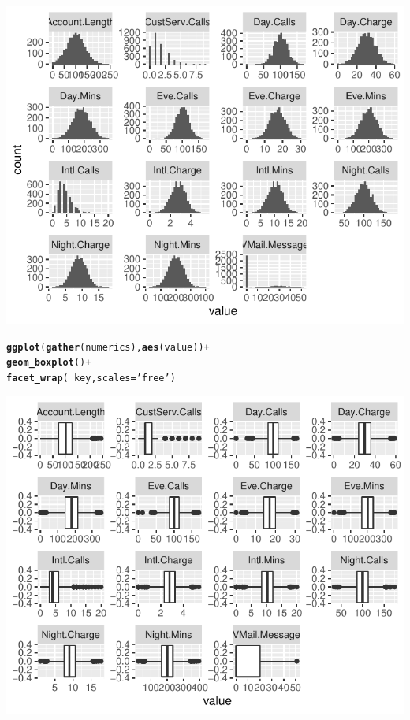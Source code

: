 \documentclass{article}\usepackage[]{graphicx}\usepackage[]{color}
\makeatletter
\def\maxwidth{ %
  \ifdim\Gin@nat@width>\linewidth
    \linewidth
  \else
    \Gin@nat@width
  \fi
}
\newcommand{\hlstr}[1]{\textcolor[rgb]{0.192,0.494,0.8}{#1}}%
\newcommand{\hlopt}[1]{\textcolor[rgb]{0,0,0}{#1}}%
\newcommand{\hlstd}[1]{\textcolor[rgb]{0.345,0.345,0.345}{#1}}%
\newcommand{\hlkwc}[1]{\textcolor[rgb]{0.333,0.667,0.333}{#1}}%
\newcommand{\hlkwd}[1]{\textcolor[rgb]{0.737,0.353,0.396}{\textbf{#1}}}%
\newenvironment{kframe}{%
 \def\at@end@of@kframe{}%
 \ifinner\ifhmode%
  \def\at@end@of@kframe{\end{minipage}}%
  \begin{minipage}{\columnwidth}%
 \fi\fi%
 \def\FrameCommand##1{\hskip\@totalleftmargin \hskip-\fboxsep
 \colorbox{shadecolor}{##1}\hskip-\fboxsep
     \hskip-\linewidth \hskip-\@totalleftmargin \hskip\columnwidth}%
 \MakeFramed {\advance\hsize-\width
   \@totalleftmargin\z@ \linewidth\hsize
   \@setminipage}}%
 {\par\unskip\endMakeFramed%
 \at@end@of@kframe}
\newenvironment{knitrout}{}{} %
\makeatother
\begin{document}
\begin{description}
\begin{knitrout}
{\centering \includegraphics[width=\maxwidth]{figure/Overviews_plots-2} 

}


\begin{kframe}\begin{alltt}
\hlkwd{ggplot}\hlstd{(}\hlkwd{gather}\hlstd{(numerics),} \hlkwd{aes}\hlstd{(value))} \hlopt{+}
  \hlkwd{geom_boxplot}\hlstd{()} \hlopt{+}
  \hlkwd{facet_wrap}\hlstd{(}\hlopt{~}\hlstd{key,} \hlkwc{scales}\hlstd{=}\hlstr{'free'}\hlstd{)}
\end{alltt}
\end{kframe}

{\centering \includegraphics[width=\maxwidth]{figure/Overviews_plots-3} 

}
\end{knitrout}
\end{description}
\end{document}
